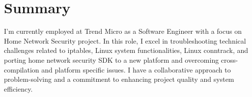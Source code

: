 \section{Summary}
I'm currently employed at Trend Micro as a Software Engineer with a focus on Home Network Security project. In this role, I excel in troubleshooting technical challenges related to iptables, Linux system functionalities, Linux conntrack, and porting home network security SDK to a new platform and overcoming cross-compilation and platform specific issues. I have a collaborative approach to problem-solving and a commitment to enhancing project quality and system efficiency.
